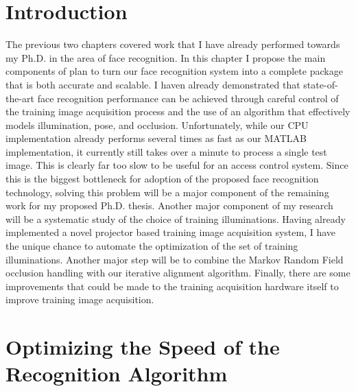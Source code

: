 \section{Introduction}

The previous two chapters covered work that I have already performed towards my
Ph.D. in the area of face recognition.  In this chapter I propose the main
components of plan to turn our face recognition system into a complete package
that is both accurate and scalable.  I haven already demonstrated that
state-of-the-art face recognition performance can be achieved through careful
control of the training image acquisition process and the use of an algorithm
that effectively models illumination, pose, and occlusion.  Unfortunately,
while our CPU implementation already performs several times as fast as our
MATLAB implementation, it currently still takes over a minute to process a
single test image.  This is clearly far too slow to be useful for an access
control system. Since this is the biggest bottleneck for adoption of the
proposed face recognition technology, solving this problem will be a major
component of the remaining work for my proposed Ph.D. thesis.  Another major
component of my research will be a systematic study of the choice of training
illuminations.  Having already implemented a novel projector based training
image acquisition system, I have the unique chance to automate the optimization
of the set of training illuminations.  Another major step will be to combine
the Markov Random Field occlusion handling with our iterative alignment
algorithm.  Finally, there are some improvements that could be made to the
training acquisition hardware itself to improve training image acquisition.  

\section{Optimizing the Speed of the Recognition Algorithm}

